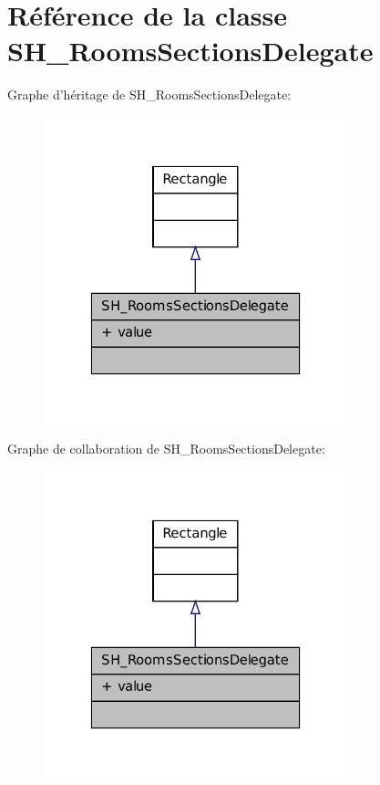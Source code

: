 \hypertarget{classSH__RoomsSectionsDelegate}{\section{Référence de la classe S\-H\-\_\-\-Rooms\-Sections\-Delegate}
\label{classSH__RoomsSectionsDelegate}
}


Graphe d'héritage de S\-H\-\_\-\-Rooms\-Sections\-Delegate\-:
\nopagebreak
\begin{figure}[H]
\begin{center}
\leavevmode
\includegraphics[width=250pt]{classSH__RoomsSectionsDelegate__inherit__graph}
\end{center}
\end{figure}


Graphe de collaboration de S\-H\-\_\-\-Rooms\-Sections\-Delegate\-:
\nopagebreak
\begin{figure}[H]
\begin{center}
\leavevmode
\includegraphics[width=250pt]{classSH__RoomsSectionsDelegate__coll__graph}
\end{center}
\end{figure}
